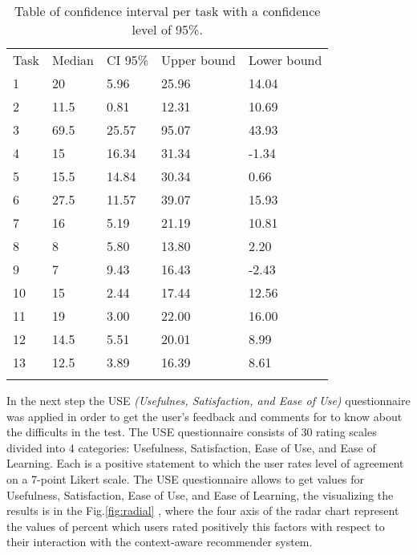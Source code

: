 \begin{table}
\centering
\caption{Table of confidence interval per task with a confidence level of 95\%. }
\label{tab:ic}    
\begin{tabular}{lllll}
\hline\noalign{\smallskip}
Task  & Median & CI 95\% & Upper bound & Lower bound  \\
\noalign{\smallskip}\hline\noalign{\smallskip}
1 &    20         & 5.96  & 25.96 & 14.04  \\
2 &    11.5      & 0.81  & 12.31  & 10.69   \\
3 &    69.5      &  25.57   &  95.07  &  43.93   \\
4 &    15        & 16.34  &  31.34  &  -1.34   \\
5 &    15.5     &  14.84  &  30.34  &  0.66  \\
6 &     27.5    &   11.57  &  39.07  &  15.93    \\
7 &     16       &  5.19  & 21.19  &  10.81   \\
8 &     8         &   5.80  &  13.80  & 2.20 \\
9 &     7         & 9.43  &  16.43  &  -2.43  \\
10 &   15       &   2.44  &  17.44   &  12.56   \\
11 &   19       &  3.00  &  22.00  &  16.00   \\
12 &   14.5    &  5.51  &  20.01  &  8.99   \\
13 &   12.5    &  3.89  &  16.39  &  8.61    \\

\noalign{\smallskip}\hline
\end{tabular}
\end{table}

In the next step the USE \textit{(Usefulnes, Satisfaction, and Ease of Use)}
questionnaire \cite{morris2001experience} was applied in order to get the user's
feedback and comments for to know about the difficults in the test.  The USE
questionnaire consists of 30 rating scales divided into 4 categories:
Usefulness, Satisfaction, Ease of Use, and Ease of Learning. Each is a positive
statement to which the user rates level of agreement on a 7-point Likert scale.
The USE questionnaire allows to get values for Usefulness, Satisfaction, Ease of
Use, and Ease of Learning, the visualizing the results is in the
Fig.\ref{fig:radial} , where the four axis of the radar chart represent the
values of percent which users rated positively this factors with respect to
their interaction with the context-aware recommender system.

